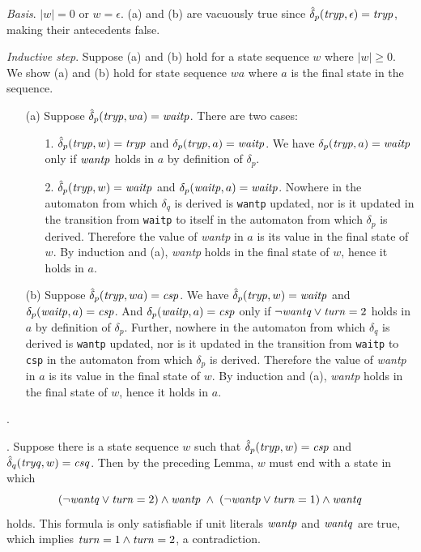 \documentclass[12pt]{article}
\newcommand{\id}[1]{\mbox{\it #1\/}}
\begin{document}
\vspace{0.5em}
{\em Basis\/}. $|w|=0$ or $w=\epsilon$.
(a) and (b) are vacuously true since $\hat{\delta}_p(\id{tryp},\epsilon)=\id{tryp}$, making
their antecedents false.

\vspace{1em}
{\em Inductive step\/}.
Suppose (a) and (b) hold for a state sequence $w$ where $|w|\geq 0$.
We show (a) and (b) hold for state sequence $wa$ where $a$ is the final state
in the sequence.

\begin{enumerate}

\item[(a)]  Suppose $\hat{\delta}_p(\id{tryp},wa)=\id{waitp}$.
There are two cases:
\begin{enumerate}
\item[1.]  $\hat{\delta}_p(\id{tryp},w)=\id{tryp}$ and $\delta_p(\id{tryp},a)=\id{waitp}$.
We have $\delta_p(\id{tryp},a)=\id{waitp}$ only if $\id{wantp}$ holds in $a$ by definition of $\delta_p$.
\item[2.]  $\hat{\delta}_p(\id{tryp},w)=\id{waitp}$ and $\delta_p(\id{waitp},a)=\id{waitp}$.
Nowhere in the automaton from which $\delta_q$ is derived is {\tt wantp} updated, nor is it
updated in the transition from {\tt waitp} to itself in the automaton from which $\delta_p$ is derived.
Therefore the value of {\em wantp\/} in $a$ is its value in the final state of $w$.
By induction and (a), {\em wantp\/} holds in the final state of $w$, hence it holds in $a$.
\end{enumerate}
\item[(b)]  Suppose $\hat{\delta}_p(\id{tryp},wa)=\id{csp}$.
We have $\hat{\delta}_p(\id{tryp},w)=\id{waitp}$ and $\delta_p(\id{waitp},a)=\id{csp}$.
And $\delta_p(\id{waitp},a)=\id{csp}$ only if $\neg\id{wantq}\vee\id{turn}=2$ holds in $a$ by definition
of $\delta_p$.
Further, nowhere in the automaton from which $\delta_q$ is derived is {\tt wantp} updated, nor is it
updated in the transition from {\tt waitp} to {\tt csp} in the automaton from which $\delta_p$ is derived.
Therefore the value of {\em wantp\/} in $a$ is its value in the final state of $w$.
By induction and (a), {\em wantp\/} holds in the final state of $w$, hence it holds in $a$.
\end{enumerate}
.

\vspace{1em}
.
Suppose there is a state sequence $w$ such that $\hat{\delta}_p(\id{tryp},w)=\id{csp}$
and $\hat{\delta}_q(\id{tryq},w)=\id{csq}$.
Then by the preceding Lemma, $w$ must end with a state in which
\[(\neg\id{wantq}\vee\id{turn}=2)\wedge\id{wantp}\;\wedge\;
(\neg\id{wantp}\vee\id{turn}=1)\wedge\id{wantq}
\]
holds. This formula is only satisfiable if unit literals $\id{wantp}$ and
$\id{wantq}$ are true, which implies $\id{turn}=1\wedge\id{turn}=2$, a contradiction.
\end{document}
